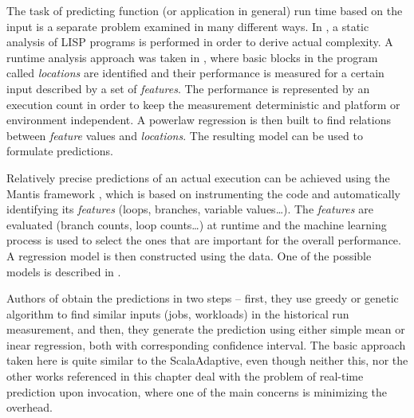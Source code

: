 The task of predicting function (or application in general) run time based on the input is a separate problem examined in many different ways. In \cite{wegbreit_mechanical_1975}, a static analysis of LISP programs is performed in order to derive actual complexity. A runtime analysis approach was taken in \cite{goldsmith_measuring_2007}, where basic blocks in the program called \textit{locations} are identified and their performance is measured for a certain input described by a set of \textit{features}. The performance is represented by an execution count in order to keep the measurement deterministic and platform or environment independent. A powerlaw regression is then built to find relations between \textit{feature} values and \textit{locations}. The resulting model can be used to formulate predictions.

Relatively precise predictions of an actual execution can be achieved using the Mantis framework \cite{chun_mantis:_2010}, which is based on instrumenting the code and automatically identifying its \textit{features} (loops, branches, variable values\dots). The \textit{features} are evaluated (branch counts, loop counts\dots) at runtime and the machine learning process is used to select the ones that are important for the overall performance. A regression model is then constructed using the data. One of the possible models is described in \cite{huang_predicting_2010}.

Authors of \cite{smith_predicting_1998} obtain the predictions in two steps -- first, they use greedy or genetic algorithm to find similar inputs (jobs, workloads) in the historical run measurement, and then, they generate the prediction using either simple mean or inear regression, both with corresponding confidence interval. The basic approach taken here is quite similar to the ScalaAdaptive, even though neither this, nor the other works referenced in this chapter deal with the problem of real-time prediction upon invocation, where one of the main concerns is minimizing the overhead.